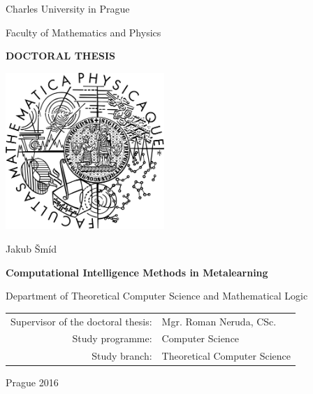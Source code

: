 \documentclass[12pt,a4paper]{report}
\begin{document}


\pagestyle{empty}
\begin{center}

\large

Charles University in Prague

\medskip

Faculty of Mathematics and Physics

\vfill

{\bf\Large DOCTORAL THESIS}

\vfill

\centerline{\mbox{\includegraphics[width=60mm]{Images/mffLogo.png}}}

\vfill
\vspace{5mm}

{\LARGE Jakub Šmíd}

\vspace{15mm}

{\LARGE\bfseries Computational Intelligence Methods in Metalearning}

\vfill

Department of Theoretical Computer Science and Mathematical Logic

\vfill

\begin{tabular}{rl}

Supervisor of the doctoral thesis: & Mgr. Roman Neruda, CSc.  \\
\noalign{\vspace{2mm}}
Study programme: & Computer Science \\
\noalign{\vspace{2mm}}
Study branch: & Theoretical Computer Science \\
\end{tabular}

\vfill

Prague 2016

\end{center}
\end{document}
